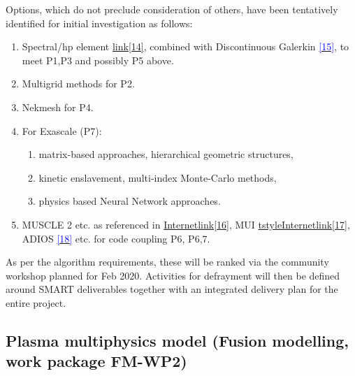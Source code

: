 \documentclass[a4paper]{article}
\newcommand\textstyleInternetlink[1]{\textcolor{blue}{#1}}
\newcommand\liststyleWWNumix{%
\renewcommand\theenumi{\arabic{enumi}}
\renewcommand\theenumii{\alph{enumii}}
\renewcommand\labelenumi{\theenumi.}
\renewcommand\labelenumii{\theenumii.}
\renewcommand\labelitemi{[F0A7?]}
\renewcommand\labelitemii{[F0B7?]}
}
\begin{document}
\bigskip

Options, which do not preclude consideration of others, have been tentatively 
identified for initial investigation as
follows:


\bigskip

\liststyleWWNumix
\begin{enumerate}
\item Spectral/hp {element
}\href{https://en.wikipedia.org/wiki/Spectral_element_method}{\textstyleInternet
link{{[14]}}}{,
combined }with Discontinuous {Galerkin
}\href{https://www.sciencedirect.com/topics/engineering/discontinuous-galerkin}{
\textstyleInternetlink{{[15]}}}{,
to }meet P1,P3 and possibly P5 above.
\item Multigrid methods for P2.
\item Nekmesh for P4.
\item For Exascale (P7):

\begin{enumerate}
\item matrix-based approaches, hierarchical geometric structures,
\item kinetic enslavement, multi-index Monte-Carlo methods,
\item physics based Neural Network approaches.
\end{enumerate}
\item {MUSCLE 2 etc. as referenced in
}\href{https://royalsocietypublishing.org/doi/10.1098/rsta.2018.0144}{\textstyle
Internetlink{{[16]}}}{,
MUI
}\href{https://www.sciencedirect.com/science/article/pii/S0021999115003228}{\tex
tstyleInternetlink{{[17]}}}{,
ADIOS
}\href{https://www.olcf.ornl.gov/center-projects/adios/}{\textstyleInternetlink{
{[18]}}}{
etc. for code }coupling P6, P6,7.
\end{enumerate}

\bigskip

As per the algorithm requirements, these will be ranked via the community 
workshop planned for Feb 2020. Activities for
defrayment will then be defined around SMART deliverables together with an 
integrated delivery plan for the entire
project.


\bigskip

\subsection[Plasma multiphysics model (Fusion modelling, work package
FM-WP2)]{\textbf{\textcolor[rgb]{0.12156863,0.28627452,0.49019608}{Plasma 
multiphysics
model}}\textcolor[rgb]{0.12156863,0.28627452,0.49019608}{ 
}\textcolor[rgb]{0.12156863,0.28627452,0.49019608}{(Fusion
modelling, work package
}\textbf{\textcolor[rgb]{0.12156863,0.28627452,0.49019608}{FM-WP2}}\textcolor[rg
b]{0.12156863,0.28627452,0.49019608}{)}}
\end{document}

